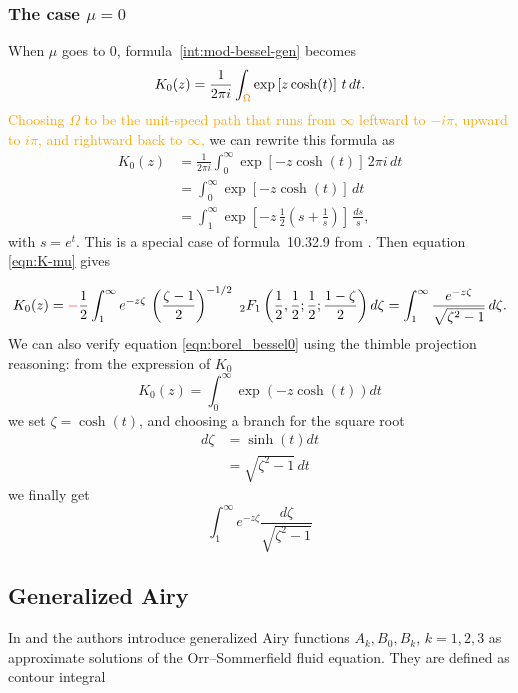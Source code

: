 \documentclass{article}
\theoremstyle{definition}
\theoremstyle{plain}
\newenvironment{verify}{\color{ForestGreen}}{\color{black}}
\begin{document}
{\subsubsection{The case $\mu=0$}
When $\mu$ goes to $0$, formula~\eqref{int:mod-bessel-gen} becomes
\[ K_0(z) = \frac{1}{2\pi i} \int_ {\textcolor{orange}{\Omega}} \exp\left[z \cosh(t)\right]\,t\,dt. \]
\textcolor{orange}{Choosing $\Omega$ to be the unit-speed path that runs from $\infty$ leftward to $-i\pi$, upward to $i\pi$, and rightward back to $\infty$,} we can rewrite this formula as
\begin{align*}
K_0(z) & = \frac{1}{2\pi i} \int_0^\infty \exp\left[-z \cosh(t)\right]\,2\pi i\,dt \\
& = \int_0^\infty \exp\left[-z \cosh(t)\right]\,dt \\
& = \int_1^\infty \exp\left[-z\,\tfrac{1}{2}\left(s + \tfrac{1}{s}\right)\right]\,\frac{ds}{s},
\end{align*}
with $s = e^t$. This is a special case of formula~10.32.9 from \cite{dlmf}. Then equation \eqref{eqn:K-mu} gives

\begin{equation}\label{eqn:borel_bessel0}
    K_0(z)=\textcolor{red}{-}\frac{1}{2}\int_1^\infty e^{-z\zeta} \, \left(\frac{\zeta-1}{2}\right)^{-1/2} \,\, {}_2F_1\left(\frac{1}{2}, \frac{1}{2};\frac{1}{2};\frac{1-\zeta}{2}\right)  d\zeta =  \int_1^\infty \frac{e^{-z\zeta}}{\sqrt{\zeta^2-1}} \, d\zeta .
\end{equation}
\begin{verify}
    We can also verify equation \eqref{eqn:borel_bessel0} using the thimble projection reasoning: from the expression of $K_0$ 
    \begin{equation}
        K_0(z)=\int_0^{\infty} \exp(-z\cosh(t)) dt
    \end{equation}
    we set $\zeta=\cosh(t)$, and choosing a branch for the square root
    \begin{align*}
        d\zeta & = \sinh(t) dt\\
        & =  \sqrt{\zeta^2-1} \, dt
    \end{align*}
    we finally get 
    \[\int_1^{\infty} e^{-z\zeta} \frac{d\zeta}{\sqrt{\zeta^2-1}}\]
\end{verify}



\subsection{Generalized Airy}
In \cite{Reid} and \cite[Appendix]{drazin-reid} the authors introduce generalized Airy functions $A_k, B_0, B_k$, $k=1,2,3$ as approximate solutions of the Orr--Sommerfield fluid equation. They are defined as contour integral \cite[Section 9.13(ii)]{dlmf}

}
\end{document}
